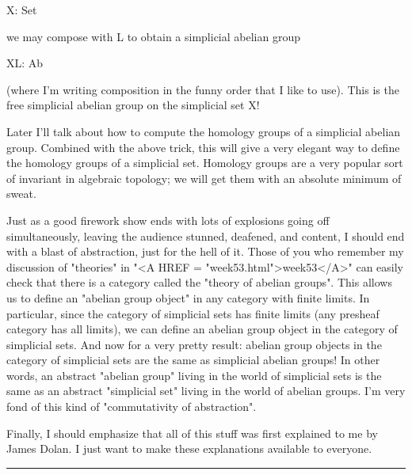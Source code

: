                        X: \Delta  \to  Set

we may compose with L to obtain a simplicial abelian group

                       XL: \Delta  \to  Ab

(where I'm writing composition in the funny order that I like to use).  
This is the free simplicial abelian group on the simplicial set X!

Later I'll talk about how to compute the homology groups of a simplicial
abelian group.  Combined with the above trick, this will give a very 
elegant way to define the homology groups of a simplicial set.  Homology
groups are a very popular sort of invariant in algebraic topology; we
will get them with an absolute minimum of sweat.

Just as a good firework show ends with lots of explosions going off
simultaneously, leaving the audience stunned, deafened, and content, I
should end with a blast of abstraction, just for the hell of it.  Those
of you who remember my discussion of "theories" in "<A HREF = "week53.html">week53</A>" can easily
check that there is a category called the "theory of abelian groups".
This allows us to define an "abelian group object" in any category with
finite limits.  In particular, since the category of simplicial sets has
finite limits (any presheaf category has all limits), we can define an
abelian group object in the category of simplicial sets.  And now for a
very pretty result: abelian group objects in the category of simplicial
sets are the same as simplicial abelian groups!  In other words, an
abstract "abelian group" living in the world of simplicial sets is the
same as an abstract "simplicial set" living in the world of abelian
groups.  I'm very fond of this kind of "commutativity of abstraction".

Finally, I should emphasize that all of this stuff was first explained
to me by James Dolan.  I just want to make these explanations available
to everyone.









 \par\noindent\rule{\textwidth}{0.4pt}

